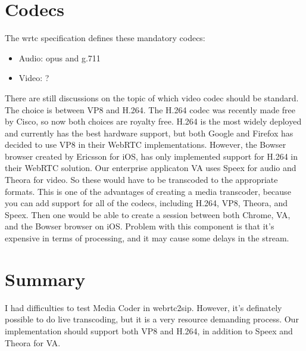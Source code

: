 \section{Codecs}

The \gls{wrtc} specification defines these mandatory codecs:
\begin{itemize}
    \item Audio: opus and g.711
    \item Video: ?
\end{itemize}

There are still discussions on the topic of which video codec should be standard. The choice is between VP8 and H.264. The H.264 codec was recently made free by Cisco\cite{h264-free}, so now both choices are royalty free. H.264 is the most widely deployed and currently has the best hardware support, but both Google and Firefox has decided to use VP8 in their WebRTC implementations. However, the Bowser browser created by Ericsson for iOS, has only implemented support for H.264 in their WebRTC solution. Our enterprise applicaton VA uses Speex for audio and Theora for video. So these would have to be transcoded to the appropriate formats. This is one of the advantages of creating a media transcoder, because you can add support for all of the codecs, including H.264, VP8, Theora, and Speex. Then one would be able to create a session between both Chrome, VA, and the Bowser browser on iOS. Problem with this component is that it's expensive in terms of processing, and it may cause some delays in the stream.

\section{Summary}
I had difficulties to test Media Coder in webrtc2sip. However, it's definately possible to do live transcoding, but it is a very resource demanding process. Our implementation should support both VP8 and H.264, in addition to Speex and Theora for VA.
